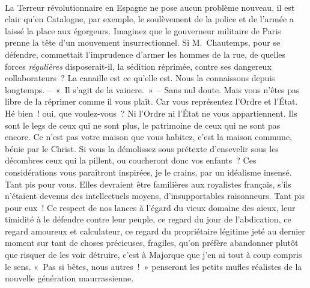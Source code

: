 \documentclass[french,twoside]{book} %
\newcommand{\astertri}{\medskip\par\centerline{\color{rubric}\large\selectfont{\syms ✻\,✻\,✻}}\medskip\par}%
\begin{document}
\noindent  \par
La Terreur révolutionnaire en Espagne ne pose aucun problème nouveau, il est clair qu’en Catalogne, par exemple, le soulèvement de la police et de l’armée a laissé la place aux égorgeurs. Imaginez que le gouverneur militaire de Paris prenne la tête d’un mouvement insurrectionnel. Si M. Chautemps, pour se défendre, commettait l’imprudence d’armer les hommes de la rue, de quelles forces \emph{régulières} disposerait-il, la sédition réprimée, contre ses dangereux collaborateurs ? La canaille est ce qu’elle est. Nous la connaissons depuis longtemps. – « Il s’agit de la vaincre. » – Sans nul doute. Mais vous n’êtes pas libre de la réprimer comme il vous plaît. Car vous représentez l’Ordre et l’État. Hé bien ! oui, que voulez-vous ? Ni l’Ordre ni l’État ne vous appartiennent. Ils sont le legs de ceux qui ne sont plus, le patrimoine de ceux qui ne sont pas encore. Ce n’est pas votre maison que vous habitez, c’est la maison commune, bénie par le Christ. Si vous la démolissez sous prétexte d’ensevelir sous les décombres ceux qui la pillent, ou coucheront donc vos enfants ? Ces considérations vous paraîtront inspirées, je le crains, par un idéalisme insensé. Tant pis pour vous. Elles devraient être familières aux royalistes français, s’ils n’étaient devenus des intellectuels moyens, d’insupportables raisonneurs. Tant pis pour eux ! Ce respect de nos lances à l’égard du vieux domaine des aïeux, leur timidité à le défendre contre leur peuple, ce regard du jour de l’abdication, ce regard amoureux et calculateur, ce regard du propriétaire légitime jeté au dernier moment sur tant de choses précieuses, fragiles, qu’on préfère abandonner plutôt que risquer de les voir détruire, c’est à Majorque que j’en ai tout à coup compris le sens. « Pas si bêtes, nous autres ! » penseront les petits mufles réalistes de la nouvelle génération maurrassienne.\par
 \par

\astertri
\end{document}
